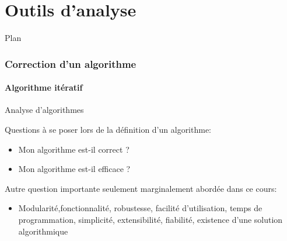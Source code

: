 
\part{Outils d'analyse}

\begin{frame}{Plan}

\tableofcontents

\end{frame}

\section{Correction d'un algorithme}

\subsection{Algorithme itératif}

\begin{frame}{Analyse d'algorithmes}

Questions à se poser lors de la définition d'un algorithme:
\begin{itemize}
\item Mon algorithme est-il correct ?
\item Mon algorithme est-il efficace ? %
\end{itemize}

\bigskip

Autre question importante seulement marginalement abordée dans ce cours:
\begin{itemize}
\item Modularité,fonctionnalité, robustesse, facilité d'utilisation, temps
  de programmation, simplicité, extensibilité, fiabilité,
  existence d'une solution algorithmique
\end{itemize}

\end{frame}

